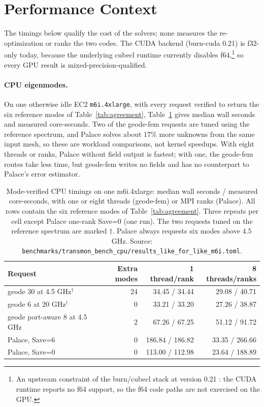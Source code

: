 \documentclass{anvil-paper}
\begin{document}
\section{Performance Context}
\label{sec:appendix-perf}

The timings below qualify the cost of the solvers; none measures the
re-optimization or ranks the two codes. The CUDA backend (burn-cuda 0.21)
is f32-only today, because the underlying cubecl runtime currently disables
f64,\footnote{An upstream constraint of the burn/cubecl stack at version
0.21 \citep{burn}: the CUDA runtime reports no f64 support, so the f64 code
paths are not exercised on the GPU.} so every GPU result is
mixed-precision-qualified.

\paragraph{CPU eigenmodes.}
On one otherwise idle EC2 \texttt{m6i.4xlarge}, with every request
verified to return the six reference modes of Table~\ref{tab:agreement},
Table~\ref{tab:cpu} gives median wall seconds and measured core-seconds.
Two of the geode-fem requests are tuned using the reference spectrum, and
Palace solves about $17\%$ more unknowns from the same input mesh, so
these are workload comparisons, not kernel speedups. With eight threads or
ranks, Palace without field output is fastest; with one, the geode-fem
routes take less time, but geode-fem writes no fields and has no
counterpart to Palace's error estimator.

\begin{table}[htbp]
  \centering
  \caption{Mode-verified CPU timings on one m6i.4xlarge: median wall
  seconds / measured core-seconds, with one or eight threads (geode-fem)
  or MPI ranks (Palace). All rows contain the six reference
  modes of Table~\ref{tab:agreement}. Three repeats per cell except Palace
  one-rank Save=0 (one run). The two requests tuned on the reference
  spectrum are marked $\dagger$. Palace always requests six modes above
  $4.5$\,GHz. Source:
  \texttt{benchmarks/transmon\_bench\_cpu/results\_like\_for\_like\_m6i.toml}.}
  \label{tab:cpu}
  \small
  \begin{tabular}{@{}lrrr@{}}
    \toprule
    Request & Extra modes & 1 thread/rank & 8 threads/ranks \\
    \midrule
    geode 30 at 4.5 GHz$^\dagger$ & 24 & 34.45 / 34.44 & 29.08 / 40.71 \\
    geode 6 at 20 GHz$^\dagger$ & 0 & 33.21 / 33.20 & 27.26 / 38.87 \\
    geode port-aware 8 at 4.5 GHz & 2 & 67.26 / 67.25 & 51.12 / 91.72 \\
    Palace, Save=6 & 0 & 186.84 / 186.82 & 33.35 / 266.66 \\
    Palace, Save=0 & 0 & 113.00 / 112.98 & 23.64 / 188.89 \\
    \bottomrule
  \end{tabular}
\end{table}
\end{document}
